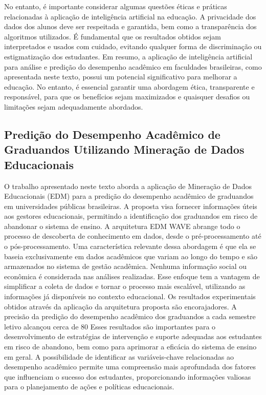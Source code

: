 \documentclass[conference]{IEEEtran}
\begin{document}
No entanto, é importante considerar algumas questões éticas e práticas relacionadas à aplicação de inteligência artificial na educação. A privacidade dos dados dos alunos deve ser respeitada e garantida, bem como a transparência dos algoritmos utilizados. É fundamental que os resultados obtidos sejam interpretados e usados com cuidado, evitando qualquer forma de discriminação ou estigmatização dos estudantes.
Em resumo, a aplicação de inteligência artificial para análise e predição do desempenho acadêmico em faculdades brasileiras, como apresentada neste texto, possui um potencial significativo para melhorar a educação. No entanto, é essencial garantir uma abordagem ética, transparente e responsável, para que os benefícios sejam maximizados e quaisquer desafios ou limitações sejam adequadamente abordados.

\subsection{Predição do Desempenho Acadêmico de Graduandos Utilizando Mineração de Dados Educacionais\cite{b2}}
O trabalho apresentado neste texto aborda a aplicação de Mineração de Dados Educacionais (EDM) para a predição do desempenho acadêmico de graduandos em universidades públicas brasileiras. A proposta visa fornecer informações úteis aos gestores educacionais, permitindo a identificação dos graduandos em risco de abandonar o sistema de ensino. A arquitetura EDM WAVE abrange todo o processo de descoberta de conhecimento em dados, desde o pré-processamento até o pós-processamento.
Uma característica relevante dessa abordagem é que ela se baseia exclusivamente em dados acadêmicos que variam ao longo do tempo e são armazenados no sistema de gestão acadêmica. Nenhuma informação social ou econômica é considerada nas análises realizadas. Esse enfoque tem a vantagem de simplificar a coleta de dados e tornar o processo mais escalável, utilizando as informações já disponíveis no contexto educacional.
Os resultados experimentais obtidos através da aplicação da arquitetura proposta são encorajadores. A precisão da predição do desempenho acadêmico dos graduandos a cada semestre letivo alcançou cerca de 80%
Esses resultados são importantes para o desenvolvimento de estratégias de intervenção e suporte adequadas aos estudantes em risco de abandono, bem como para aprimorar a eficácia do sistema de ensino em geral. A possibilidade de identificar as variáveis-chave relacionadas ao desempenho acadêmico permite uma compreensão mais aprofundada dos fatores que influenciam o sucesso dos estudantes, proporcionando informações valiosas para o planejamento de ações e políticas educacionais.
\end{document}
